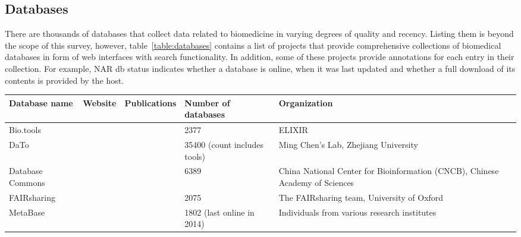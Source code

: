 \documentclass{article}
\begin{document}
\newpage
\begin{landscape}

\subsection{Databases}
\label{sec:databases}

There are thousands of databases that collect data related to biomedicine in varying degrees of quality and recency. Listing them is beyond the scope of this survey, however, table~\ref{table:databases} contains a list of projects that provide comprehensive collections of biomedical databases in form of web interfaces with search functionality. In addition, some of these projects provide annotations for each entry in their collection. For example, NAR db status \cite{nardbstatus_website} indicates whether a database is online, when it was last updated and whether a full download of its contents is provided by the host.


\begin{xltabular}{\textwidth}{p{5cm}|p{2.2cm}|p{2.2cm}|p{4cm}|p{6cm}}
Database name
&
Website
&
Publications
&
Number of databases
&
Organization
\\


\hline
\hline


Bio.tools
&
\cite{biotools_website}
&
\cite{biotools_publication}
&
2377
&
ELIXIR
\cite{biotools_group}
\\


\hline


DaTo
&
\cite{dato_website}
&
\cite{dato_publication}
&
35400 (count includes tools)
&
Ming Chen's Lab,
Zhejiang University
\cite{dato_group}
\\


\hline


Database Commons
&
\cite{databasecommons_website}
&
\cite{databasecommons_publication}
&
6389
&
China National Center for Bioinformation (CNCB),
Chinese Academy of Sciences
\cite{databasecommons_group}
\\


\hline


FAIRsharing
&
\cite{fairsharing_website}
&
\cite{fairsharing_publication}
&
2075
&
The FAIRsharing team,
University of Oxford
\cite{fairsharing_group}
\\


\hline


MetaBase
&
\cite{metabase_website}
&
\cite{metabase_publication}
&
1802 (last online in 2014)
&
Individuals from various research institutes
\\



\end{xltabular}
\end{landscape}
\end{document}
